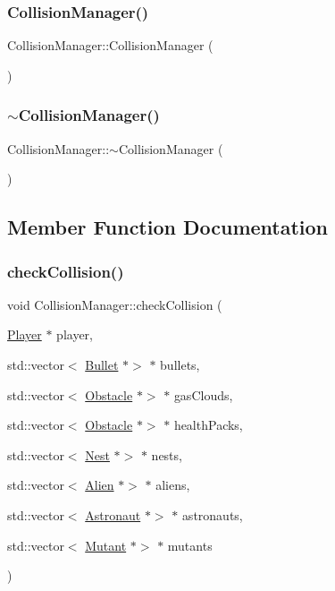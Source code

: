 \subsubsection{\texorpdfstring{Collision\+Manager()}{CollisionManager()}}
{\footnotesize\ttfamily Collision\+Manager\+::\+Collision\+Manager (\begin{DoxyParamCaption}{ }\end{DoxyParamCaption})}

\mbox{\label{class_collision_manager_acdbb3c842f0ef1c7a028d3f080855766}} 
\subsubsection{\texorpdfstring{$\sim$\+Collision\+Manager()}{~CollisionManager()}}
{\footnotesize\ttfamily Collision\+Manager\+::$\sim$\+Collision\+Manager (\begin{DoxyParamCaption}{ }\end{DoxyParamCaption})}



\subsection{Member Function Documentation}
\mbox{\label{class_collision_manager_afc1b2d0d08aeed558617c071a68f0d98}} 
\subsubsection{\texorpdfstring{check\+Collision()}{checkCollision()}}
{\footnotesize\ttfamily void Collision\+Manager\+::check\+Collision (\begin{DoxyParamCaption}\item[{\hyperlink{class_player}{Player} $\ast$}]{player,  }\item[{std\+::vector$<$ \hyperlink{class_bullet}{Bullet} $\ast$$>$ $\ast$}]{bullets,  }\item[{std\+::vector$<$ \hyperlink{class_obstacle}{Obstacle} $\ast$$>$ $\ast$}]{gas\+Clouds,  }\item[{std\+::vector$<$ \hyperlink{class_obstacle}{Obstacle} $\ast$$>$ $\ast$}]{health\+Packs,  }\item[{std\+::vector$<$ \hyperlink{class_nest}{Nest} $\ast$$>$ $\ast$}]{nests,  }\item[{std\+::vector$<$ \hyperlink{class_alien}{Alien} $\ast$$>$ $\ast$}]{aliens,  }\item[{std\+::vector$<$ \hyperlink{class_astronaut}{Astronaut} $\ast$$>$ $\ast$}]{astronauts,  }\item[{std\+::vector$<$ \hyperlink{class_mutant}{Mutant} $\ast$$>$ $\ast$}]{mutants }\end{DoxyParamCaption})}



